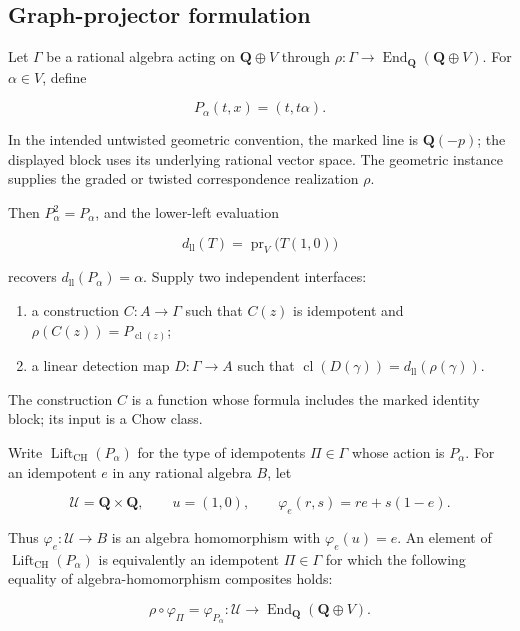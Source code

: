 \documentclass[11pt]{article}
\theoremstyle{definition}
\theoremstyle{remark}
\DeclareMathOperator{\End}{End}
\DeclareMathOperator{\Lift}{Lift}
\newcommand{\Q}{\mathbf Q}
\begin{document}
\clearpage

\subsection{Graph-projector formulation}

Let \(\Gamma\) be a rational algebra acting on \(\Q\oplus V\) through
\(\rho:\Gamma\to\End_{\Q}(\Q\oplus V)\).  For \(\alpha\in V\), define

\[
  P_\alpha(t,x)=(t,t\alpha).
\]

In the intended untwisted geometric convention, the marked line is
\(\Q(-p)\); the displayed block uses its underlying rational vector space.
The geometric instance supplies the graded or twisted correspondence
realization \(\rho\).

Then \(P_\alpha^2=P_\alpha\), and the lower-left evaluation

\[
  d_{\mathrm{ll}}(T)
  =\operatorname{pr}_V\bigl(T(1,0)\bigr)
\]

recovers \(d_{\mathrm{ll}}(P_\alpha)=\alpha\).  Supply two independent
interfaces:

\begin{enumerate}[label=\textup{(\roman*)},leftmargin=2.6em]
  \item a construction \(C:A\to\Gamma\) such that \(C(z)\) is idempotent
        and \(\rho(C(z))=P_{\operatorname{cl}(z)}\);
  \item a linear detection map \(D:\Gamma\to A\) such that
        \(\operatorname{cl}(D(\gamma))=d_{\mathrm{ll}}(\rho(\gamma))\).
\end{enumerate}

The construction \(C\) is a function whose formula includes the marked
identity block; its input is a Chow class.

Write \(\Lift_{\mathrm{CH}}(P_\alpha)\) for the type of idempotents
\(\Pi\in\Gamma\) whose action is \(P_\alpha\).
For an idempotent \(e\) in any rational algebra \(B\), let

\[
  \mathcal U=\Q\times\Q,\qquad u=(1,0),\qquad
  \varphi_e(r,s)=re+s(1-e).
\]

Thus \(\varphi_e:\mathcal U\to B\) is an algebra homomorphism with
\(\varphi_e(u)=e\).  An element of
\(\Lift_{\mathrm{CH}}(P_\alpha)\) is equivalently an idempotent
\(\Pi\in\Gamma\) for which the following equality of algebra-homomorphism
composites holds:

\begin{equation}
\label{eq:abstract-palomar-target}
  \rho\circ\varphi_\Pi
    =\varphi_{P_\alpha}:
      \mathcal U\longrightarrow\End_{\Q}(\Q\oplus V).
\end{equation}
\end{document}
